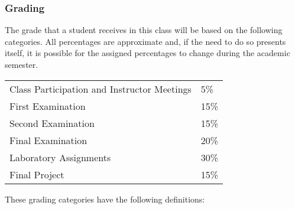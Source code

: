 \subsubsection*{Grading}

The grade that a student receives in this class will be based on the following categories. All percentages are
approximate and, if the need to do so presents itself, it is possible for the assigned percentages to change during the
academic semester. 

\begin{center}
  \begin{tabular}{ll}
    Class Participation and Instructor Meetings & 5\% \\
    First Examination & 15\% \\
    Second Examination & 15\% \\
    Final Examination & 20\% \\
    Laboratory Assignments & 30\% \\
    Final Project & 15\%
  \end{tabular}
\end{center}

\vspace*{-.1in}
\noindent
These grading categories have the following definitions:
\vspace*{-.1in}

